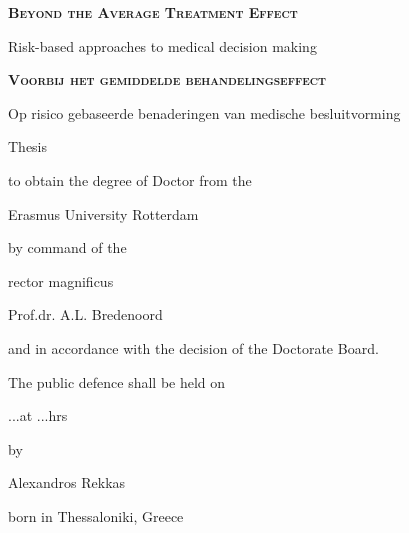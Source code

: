 \begin{center}
\textbf{\textsc{Beyond the Average Treatment Effect}}\par
Risk-based approaches to medical decision making \par

\vspace*{1.1cm}

\textbf{\textsc{Voorbij het gemiddelde behandelingseffect}}\par
Op risico gebaseerde benaderingen van medische besluitvorming \par

\vspace*{1.4cm}

Thesis \par
to obtain the degree of Doctor from the\par
Erasmus University Rotterdam \par
by command of the \par
rector magnificus \par

\vspace*{0.8cm}

Prof.dr. A.L. Bredenoord \par

\vspace*{0.8cm}

and in accordance with the decision of the Doctorate Board. \par
The public defence shall be held on \par

\vspace*{0.6cm}

...at ...hrs \par

\vspace*{0.6cm}

by \par

\vspace*{0.6cm}

Alexandros Rekkas \par
born in Thessaloniki, Greece

\end{center}

\vspace*{0.8cm}

